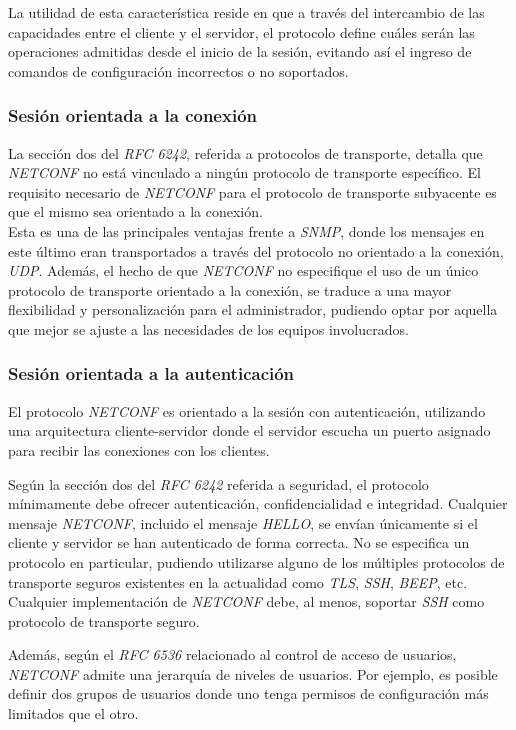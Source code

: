   La utilidad de esta característica reside en que a través del intercambio de las capacidades entre el cliente y el servidor, el protocolo define cuáles serán las operaciones admitidas desde el inicio de la sesión, evitando así el ingreso de comandos de configuración incorrectos o no soportados. 


  \subsubsection{Sesión orientada a la conexión}
  La sección dos del \textit{RFC 6242}, referida a protocolos de transporte, detalla que \textit{NETCONF} no está vinculado a ningún protocolo de transporte específico. El requisito necesario de \textit{NETCONF} para el protocolo de transporte subyacente es que el mismo sea orientado a la conexión. 
  \\

  Esta es una de las principales ventajas frente a \textit{SNMP}, donde los mensajes en este último eran transportados a través del protocolo no orientado a la conexión, \textit{UDP}. Además, el hecho de que \textit{NETCONF} no especifique el uso de un único protocolo de transporte orientado a la conexión, se traduce a una mayor flexibilidad y personalización para el administrador, pudiendo optar por aquella que mejor se ajuste a las necesidades de los equipos involucrados.


  \subsubsection{Sesión orientada a la autenticación}
  El protocolo \textit{NETCONF} es orientado a la sesión con autenticación, utilizando una arquitectura cliente-servidor donde el servidor escucha un puerto asignado para recibir las conexiones con los clientes. 

  Según la sección dos del \textit{RFC 6242} referida a seguridad, el protocolo mínimamente debe ofrecer autenticación, confidencialidad e integridad. Cualquier mensaje \textit{NETCONF}, incluido el mensaje \textit{HELLO}, se envían únicamente si el cliente y servidor se han autenticado de forma correcta. No se especifica un protocolo en particular, pudiendo utilizarse alguno de los múltiples protocolos de transporte seguros existentes en la actualidad como \textit{TLS}, \textit{SSH}, \textit{BEEP}, etc. Cualquier implementación de \textit{NETCONF} debe, al menos, soportar \textit{SSH} como protocolo de transporte seguro.

  Además, según el \textit{RFC 6536} relacionado al control de acceso de usuarios, \textit{NETCONF} admite una jerarquía de niveles de usuarios. Por ejemplo, es posible definir dos grupos de usuarios donde uno tenga permisos de configuración más limitados que el otro.

